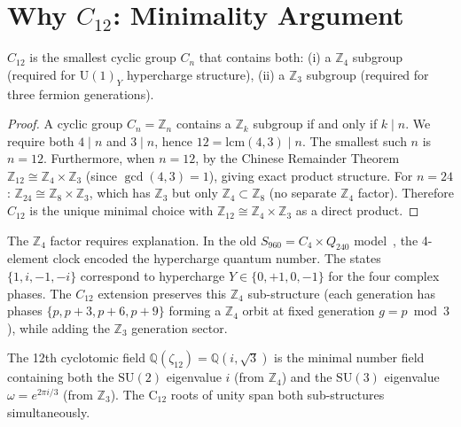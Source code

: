 
\appendix

\section{Why $C_{12}$: Minimality Argument}
\label{app:why_c12}

\begin{proposition}[Minimality of $C_{12}$]
  $C_{12}$ is the smallest cyclic group $C_n$ that contains both:
  (i) a $\mathbb{Z}_4$ subgroup (required for $\mathrm{U}(1)_Y$ hypercharge structure),
  (ii) a $\mathbb{Z}_3$ subgroup (required for three fermion generations).
\end{proposition}

\begin{proof}
  A cyclic group $C_n = \mathbb{Z}_n$ contains a $\mathbb{Z}_k$ subgroup if and only if
  $k \mid n$.  We require both $4 \mid n$ and $3 \mid n$, hence $12 = \mathrm{lcm}(4,3) \mid n$.
  The smallest such $n$ is $n = 12$.  Furthermore, when $n = 12$, by the Chinese Remainder
  Theorem $\mathbb{Z}_{12} \cong \mathbb{Z}_4 \times \mathbb{Z}_3$ (since $\gcd(4,3)=1$),
  giving exact product structure.  For $n = 24$: $\mathbb{Z}_{24} \cong \mathbb{Z}_8 \times \mathbb{Z}_3$,
  which has $\mathbb{Z}_3$ but only $\mathbb{Z}_4 \subset \mathbb{Z}_8$ (no separate $\mathbb{Z}_4$ factor).
  Therefore $C_{12}$ is the unique minimal choice with $\mathbb{Z}_{12} \cong \mathbb{Z}_4 \times \mathbb{Z}_3$
  as a direct product.
\end{proof}

\begin{remark}
  The $\mathbb{Z}_4$ factor requires explanation.  In the old $S_{960} = C_4 \times Q_{240}$
  model~\cite{RFC009_S960}, the 4-element clock encoded the hypercharge quantum number.
  The states $\{1, i, -1, -i\}$ correspond to hypercharge $Y \in \{0, +1, 0, -1\}$ for
  the four complex phases.  The $C_{12}$ extension preserves this $\mathbb{Z}_4$ sub-structure
  (each generation has phases $\{p, p+3, p+6, p+9\}$ forming a $\mathbb{Z}_4$ orbit at fixed
  generation $g = p \bmod 3$), while adding the $\mathbb{Z}_3$ generation sector.

  The 12th cyclotomic field $\mathbb{Q}(\zeta_{12}) = \mathbb{Q}(i, \sqrt{3})$ is the minimal
  number field containing both the $\mathrm{SU}(2)$ eigenvalue $i$ (from $\mathbb{Z}_4$) and
  the $\mathrm{SU}(3)$ eigenvalue $\omega = e^{2\pi i/3}$ (from $\mathbb{Z}_3$).  The C$_{12}$
  roots of unity span both sub-structures simultaneously.
\end{remark}

